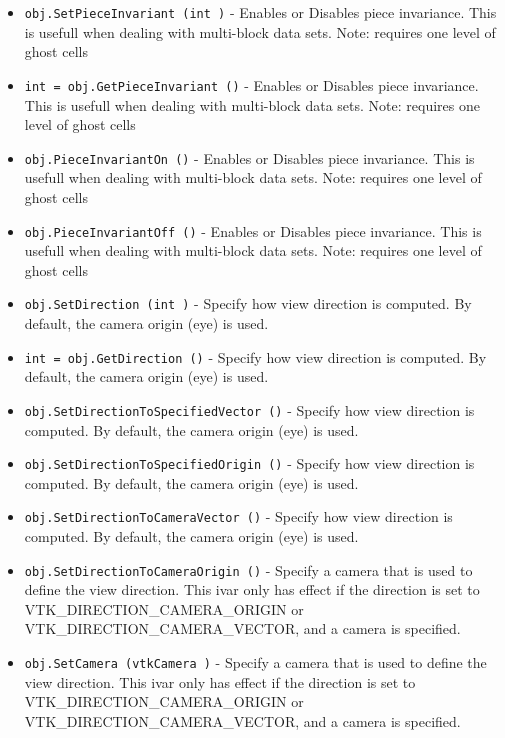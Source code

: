 \begin{itemize}
\item  \verb|obj.SetPieceInvariant (int )| -  Enables or Disables piece invariance. This is usefull when dealing with
 multi-block data sets. Note: requires one level of ghost cells

\item  \verb|int = obj.GetPieceInvariant ()| -  Enables or Disables piece invariance. This is usefull when dealing with
 multi-block data sets. Note: requires one level of ghost cells

\item  \verb|obj.PieceInvariantOn ()| -  Enables or Disables piece invariance. This is usefull when dealing with
 multi-block data sets. Note: requires one level of ghost cells

\item  \verb|obj.PieceInvariantOff ()| -  Enables or Disables piece invariance. This is usefull when dealing with
 multi-block data sets. Note: requires one level of ghost cells

\item  \verb|obj.SetDirection (int )| -  Specify how view direction is computed. By default, the
 camera origin (eye) is used.

\item  \verb|int = obj.GetDirection ()| -  Specify how view direction is computed. By default, the
 camera origin (eye) is used.

\item  \verb|obj.SetDirectionToSpecifiedVector ()| -  Specify how view direction is computed. By default, the
 camera origin (eye) is used.

\item  \verb|obj.SetDirectionToSpecifiedOrigin ()| -  Specify how view direction is computed. By default, the
 camera origin (eye) is used.

\item  \verb|obj.SetDirectionToCameraVector ()| -  Specify how view direction is computed. By default, the
 camera origin (eye) is used.

\item  \verb|obj.SetDirectionToCameraOrigin ()| -  Specify a camera that is used to define the view direction.  This ivar
 only has effect if the direction is set to VTK\_DIRECTION\_CAMERA\_ORIGIN or
 VTK\_DIRECTION\_CAMERA\_VECTOR, and a camera is specified.

\item  \verb|obj.SetCamera (vtkCamera )| -  Specify a camera that is used to define the view direction.  This ivar
 only has effect if the direction is set to VTK\_DIRECTION\_CAMERA\_ORIGIN or
 VTK\_DIRECTION\_CAMERA\_VECTOR, and a camera is specified.


\end{itemize}
